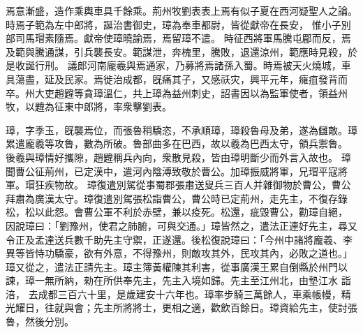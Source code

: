 \begin{pinyinscope}
 
焉意漸盛，造作乘輿車具千餘乘。荊州牧劉表表上焉有似子夏在西河疑聖人之論。時焉子範為左中郎將，誕治書御史，璋為奉車都尉，皆從獻帝在長安，
 惟小子別部司馬瑁素隨焉。獻帝使璋曉諭焉，焉留璋不遣。
 時征西將軍馬騰屯郿而反，焉及範與騰通謀，引兵襲長安。範謀泄，奔槐里，騰敗，退還涼州，範應時見殺，於是收誕行刑。
 議郎河南龐羲與焉通家，乃募將焉諸孫入蜀。時焉被天火燒城，車具蕩盡，延及民家。焉徙治成都，旣痛其子，又感祅灾，興平元年，癕疽發背而卒。州大吏趙韙等貪璋溫仁，共上璋為益州刺史，詔書因以為監軍使者，領益州牧，以韙為征東中郎將，率衆擊劉表。
 
 
璋，字季玉，旣襲焉位，而張魯稍驕恣，不承順璋，璋殺魯母及弟，遂為讎敵。璋累遣龐羲等攻魯，數為所破。魯部曲多在巴西，故以羲為巴西太守，領兵禦魯。
 後羲與璋情好攜隙，趙韙稱兵內向，衆散見殺，皆由璋明斷少而外言入故也。
 璋聞曹公征荊州，已定漢中，遣河內陰溥致敬於曹公。加璋振威將軍，兄瑁平寇將軍。瑁狂疾物故。
 璋復遣別駕從事蜀郡張肅送叟兵三百人并雜御物於曹公，曹公拜肅為廣漢太守。璋復遣別駕張松詣曹公，曹公時已定荊州，走先主，不復存錄松，松以此怨。會曹公軍不利於赤壁，兼以疫死。松還，疵毀曹公，勸璋自絕，
 因說璋曰：「劉豫州，使君之肺腑，可與交通。」璋皆然之，遣法正連好先主，尋又令正及孟達送兵數千助先主守禦，正遂還。後松復說璋曰：「今州中諸將龐羲、李異等皆恃功驕豪，欲有外意，不得豫州，則敵攻其外，民攻其內，必敗之道也。」璋又從之，遣法正請先主。璋主簿黃權陳其利害，從事廣漢王累自倒縣於州門以諫，璋一無所納，勑在所供奉先主，先主入境如歸。先主至江州北，由墊江水
 詣涪，
 去成都三百六十里，是歲建安十六年也。璋率步騎三萬餘人，車乘帳幔，精光耀日，往就與會；先主所將將士，更相之適，歡飲百餘日。璋資給先主，使討張魯，然後分別。
 

\end{pinyinscope}
